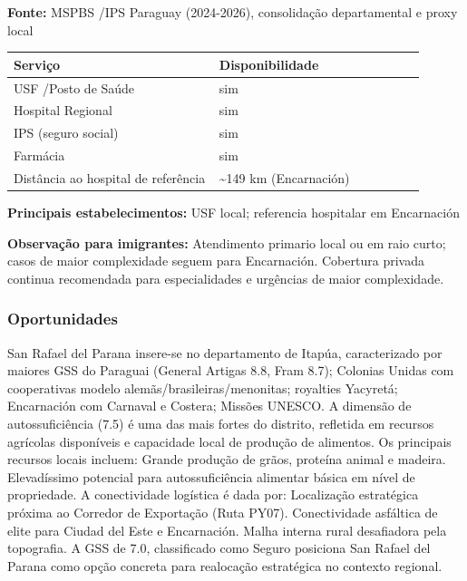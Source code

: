 \textbf{Fonte:} MSPBS /\allowbreak  IPS Paraguay (2024-2026), consolidação
departamental e proxy local

{\def\LTcaptype{none} %
\begin{longtable}{@{}>{\raggedright\arraybackslash}p{0.45\linewidth} >{\raggedright\arraybackslash}p{0.45\linewidth}@{}}
\toprule\noalign{}
Serviço & Disponibilidade \\
\midrule\noalign{}
\endhead
\bottomrule\noalign{}
\endlastfoot
USF /\allowbreak  Posto de Saúde & sim \\
Hospital Regional & sim \\
IPS (seguro social) & sim \\
Farmácia & sim \\
Distância ao hospital de referência & \textasciitilde149 km
(Encarnación) \\
\end{longtable}
}

\textbf{Principais estabelecimentos:} USF local; referencia hospitalar
em Encarnación

\textbf{Observação para imigrantes:} Atendimento primario local ou em
raio curto; casos de maior complexidade seguem para Encarnación.
Cobertura privada continua recomendada para especialidades e urgências
de maior complexidade.
\newpage

\subsubsection*{Oportunidades}\label{oport-san-rafael-del-parana-0721}
San Rafael del Parana insere-se no departamento de Itapúa, caracterizado por maiores GSS do Paraguai (General Artigas 8.8, Fram 8.7); Colonias Unidas com cooperativas modelo alemãs/brasileiras/menonitas; royalties Yacyretá; Encarnación com Carnaval e Costera; Missões UNESCO. A dimensão de autossuficiência (7.5) é uma das mais fortes do distrito, refletida em recursos agrícolas disponíveis e capacidade local de produção de alimentos. Os principais recursos locais incluem: Grande produção de grãos, proteína animal e madeira. Elevadíssimo potencial para autossuficiência alimentar básica em nível de propriedade. A conectividade logística é dada por: Localização estratégica próxima ao Corredor de Exportação (Ruta PY07). Conectividade asfáltica de elite para Ciudad del Este e Encarnación. Malha interna rural desafiadora pela topografia. A GSS de 7.0, classificado como Seguro posiciona San Rafael del Parana como opção concreta para realocação estratégica no contexto regional.

